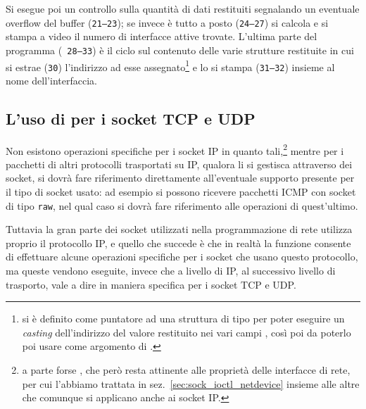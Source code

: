 Si esegue poi un controllo sulla quantità di dati restituiti segnalando un
eventuale overflow del buffer (\texttt{\small 21--23}); se invece è tutto a
posto (\texttt{\small 24--27}) si calcola e si stampa a video il numero di
interfacce attive trovate.  L'ultima parte del programma (\texttt{\small
  28--33}) è il ciclo sul contenuto delle varie strutture 
restituite in cui si estrae (\texttt{\small 30}) l'indirizzo ad esse
assegnato\footnote{si è definito  come puntatore ad una struttura
  di tipo  per poter eseguire un \textit{casting}
  dell'indirizzo del valore restituito nei vari campi , così
  poi da poterlo poi usare come argomento di .}  e lo si
stampa (\texttt{\small 31--32}) insieme al nome dell'interfaccia.



\subsection{L'uso di  per i socket TCP e UDP}
\label{sec:sock_ioctl_IP}

Non esistono operazioni specifiche per i socket IP in quanto tali,\footnote{a
  parte forse , che però resta attinente alle proprietà
  delle interfacce di rete, per cui l'abbiamo trattata in
  sez.~\ref{sec:sock_ioctl_netdevice} insieme alle altre che comunque si
  applicano anche ai socket IP.} mentre per i pacchetti di altri protocolli
trasportati su IP, qualora li si gestisca attraverso dei socket, si dovrà fare
riferimento direttamente all'eventuale supporto presente per il tipo di socket
usato: ad esempio si possono ricevere pacchetti ICMP con socket di tipo
\texttt{raw}, nel qual caso si dovrà fare riferimento alle operazioni di
quest'ultimo.

Tuttavia la gran parte dei socket utilizzati nella programmazione di rete
utilizza proprio il protocollo IP, e quello che succede è che in realtà la
funzione  consente di effettuare alcune operazioni specifiche per
i socket che usano questo protocollo, ma queste vendono eseguite, invece che a
livello di IP, al successivo livello di trasporto, vale a dire in maniera
specifica per i socket TCP e UDP.


